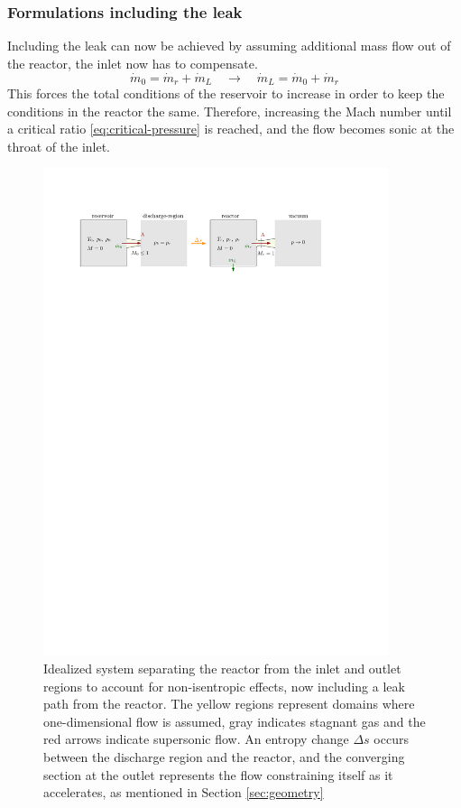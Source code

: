 \subsubsection*{Formulations including the leak}
	Including the leak can now be achieved by assuming additional mass flow out of the reactor, the inlet now has to compensate.
	$$
		\dot{m}_0 = \dot{m}_r + \dot{m}_L
			\quad \to \quad
		\dot{m}_L = \dot{m}_0 + \dot{m}_r
	$$
	This forces the total conditions of the reservoir to increase in order to keep the conditions in the reactor the same.
	Therefore, increasing the Mach number until a critical ratio \eqref{eq:critical-pressure} is reached, and the flow becomes sonic at the throat of the inlet.
	\begin{figure}[H]
	    \centering
	    \includegraphics[width=0.9\textwidth]{src/03_analytical-work/fig_disconnected-reservoirs-with-leak.pdf}
	    \caption{
			Idealized system separating the reactor from the inlet and outlet regions to account for non-isentropic effects, now including a leak path from the reactor.
			The yellow regions represent domains where one-dimensional flow is assumed, gray indicates stagnant gas and the red arrows indicate supersonic flow.
			An entropy change $\Delta s$ occurs between the discharge region and the reactor, and the converging section at the outlet represents the flow constraining itself as it accelerates, as mentioned in Section \ref{sec:geometry}
		}
	    \label{fig:disconnected-reservoirs-leak}
	\end{figure}

